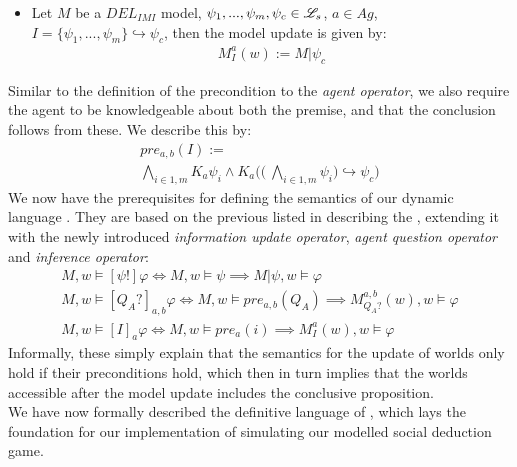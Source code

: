 \begin{itemize}
    \item Let $M$ be a $DEL_{IMI}$ model, $\psi_1,...,\psi_m, \psi_c \in \mathscr{L}_s$,
          $a\in Ag$, $I=\{\psi_1,...,\psi_m\} \hookrightarrow \psi_c$, then the model
          update is given by:
          \begin{gather}
              M^a_I(w) := M|\psi_c
          \end{gather}
\end{itemize}
Similar to the definition of the precondition to the \textit{agent operator}, we also require the agent to be knowledgeable about both the premise, and that the conclusion follows from these. We describe this by:
\begin{gather}
    \nonumber pre_{a,b}(I) := \\ \bigwedge\limits_{i\in1,m}K_a\psi_i \land K_a\Biggl(\Biggl(\:\bigwedge\limits_{i\in 1,m}\psi_i\Biggr) \hookrightarrow \psi_c \Biggr)
\end{gather}
We now have the prerequisites for defining the semantics of our dynamic language \dynlang. They are based on the previous listed in  describing the \staticlang, extending it with the newly introduced \textit{information update operator}, \textit{agent question operator} and \textit{inference operator}:
\begin{gather}
    M, w \models [\psi!]\varphi \iff M, w \models \psi \implies M|\psi, w \models \varphi \\
    M, w \models [Q_A?]_{a,b}\varphi \iff M, w \models pre_{a,b}(Q_A) \implies M^{a,b}_{Q_A?}(w), w \models \varphi \\
    M, w \models [I]_a\varphi \iff M, w \models pre_a(i) \implies M^a_I(w), w \models \varphi
\end{gather}
Informally, these simply explain that the semantics for the update of worlds only hold if their preconditions hold, which then in turn implies that the worlds accessible after the model update includes the conclusive proposition. \\

We have now formally described the definitive language of \dynlang, which lays
the foundation for our implementation of simulating our modelled social
deduction game.

